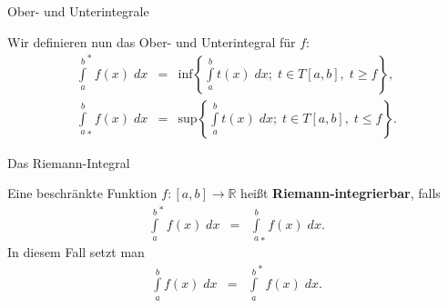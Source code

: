 \documentclass[german]{beamer}
\newcommand{\bq}{\begin{eqnarray*}}
\newcommand{\eq}{\end{eqnarray*}}
\begin{document}
\begin{frame}{Ober- und Unterintegrale}

\begin{definition}
Wir definieren nun das Ober- und Unterintegral f\"ur $f$:
\bq
 {\int\limits_a^b}^\ast f(x) \; dx 
 & = &
 \mbox{inf} \left\{ \int\limits_a^b t(x) \; dx; \; t \in T[a,b], \; t \ge f \right\},
 \nonumber \\
 {\int\limits_a^b}_\ast f(x) \; dx 
 & = &
 \mbox{sup} \left\{ \int\limits_a^b t(x) \; dx; \; t \in T[a,b], \; t \le f \right\}.
\eq
\end{definition}

\end{frame}

\begin{frame}{Das Riemann-Integral}

\begin{definition}
Eine beschr\"ankte Funktion $f : [a,b] \rightarrow \mathbb R$
hei{\ss}t {\bf Riemann-integrierbar}, falls
\bq
 {\int\limits_a^b}^\ast f(x) \; dx 
 & = &
 {\int\limits_a^b}_\ast f(x) \; dx.
\eq
In diesem Fall setzt man
\bq
 {\int\limits_a^b} f(x) \; dx 
 & = & 
 {\int\limits_a^b}^\ast f(x) \; dx.
\eq
\end{definition}

\end{frame}
\end{document}

